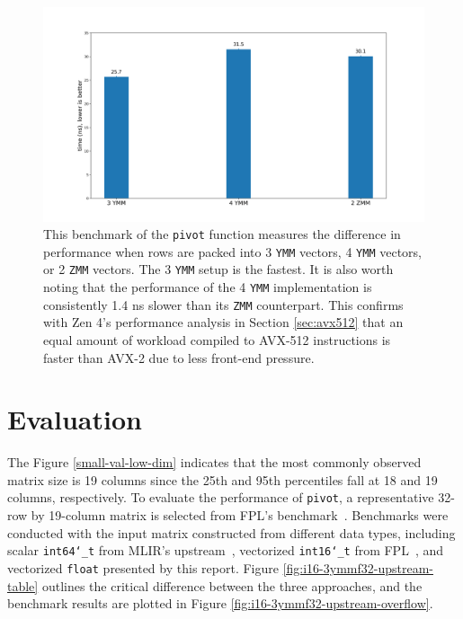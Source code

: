 \documentclass[logo,bsc,singlespacing,parskip]{infthesis}
\newcommand{\dtshort}{\texttt{int16\char`_t}}
\newcommand{\dtlong}{\texttt{int64\char`_t}}
\newcommand{\dtfloat}{\texttt{float}}
\newcommand{\pivot}{\texttt{pivot}}
\newcommand{\ymm}{\texttt{YMM}}
\newcommand{\zmm}{\texttt{ZMM}}
\begin{document}
\begin{figure}[H]
    \begin{center}
        \includegraphics[width=\linewidth]{image/3ymm-4ymm-2zmm.png}
    \end{center}
    \caption{This benchmark of the \pivot{} function measures the difference in performance when rows are packed into 3 \ymm{} vectors, 4 \ymm{} vectors, or 2 \zmm{} vectors. The 3 \ymm{} setup is the fastest. It is also worth noting that the performance of the 4 \ymm{} implementation is consistently 1.4 ns slower than its \zmm{} counterpart. This confirms with Zen 4's performance analysis in Section \ref{sec:avx512} that an equal amount of workload compiled to AVX-512 instructions is faster than AVX-2 due to less front-end pressure. }
    \label{fig:3ymm-4ymm-2zmm}
\end{figure}








\section{Evaluation}

The Figure \ref{small-val-low-dim} indicates that the most commonly observed matrix size is 19 columns since the 25th and 95th percentiles fall at 18 and 19 columns, respectively. To evaluate the performance of \pivot{}, a representative 32-row by 19-column matrix is selected from FPL's benchmark~\cite{FPL2}. Benchmarks were conducted with the input matrix constructed from different data types, including scalar \dtlong{} from MLIR's upstream~\cite{FPL1}, vectorized \dtshort{} from FPL~\cite{FPL2}, and vectorized \dtfloat{} presented by this report. Figure \ref{fig:i16-3ymmf32-upstream-table} outlines the critical difference between the three approaches, and the benchmark results are plotted in Figure \ref{fig:i16-3ymmf32-upstream-overflow}.
\end{document}

